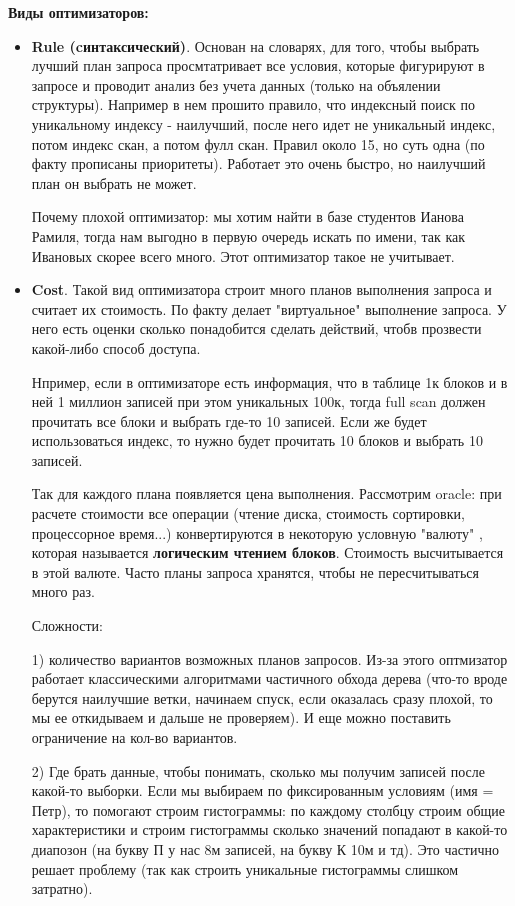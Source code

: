 \textbf{Виды оптимизаторов:} 
\begin{itemize}
    \item \textbf{Rule (cинтаксический)}. Основан на словарях, для того, чтобы выбрать лучший план запроса просмтатривает все условия, которые фигурируют в запросе и проводит анализ без учета данных (только на объялении структуры). Например в нем прошито правило, что индексный поиск по уникальному индексу - наилучший, после него идет не уникальный индекс, потом индекс скан, а потом фулл скан. Правил около 15, но суть одна (по факту прописаны приоритеты). Работает это очень быстро, но наилучший план он выбрать не может.
    
Почему плохой оптимизатор: мы хотим найти в базе студентов Ианова Рамиля, тогда нам выгодно в первую очередь искать по имени, так как Ивановых скорее всего много. Этот оптимизатор такое не учитывает. 

\item \textbf{Cost}. Такой вид оптимизатора строит много планов выполнения запроса и считает их стоимость. По факту делает "виртуальное" выполнение запроса. У него есть оценки сколько понадобится сделать действий, чтобв прозвести какой-либо способ доступа. 
    
Нпример, если в оптимизаторе есть информация, что в таблице 1к блоков и в ней 1 миллион записей при этом уникальных 100к, тогда full scan должен прочитать все блоки и выбрать где-то 10 записей. Если же будет использоваться индекс, то нужно будет прочитать 10 блоков и выбрать 10 записей. 
    
Так для каждого плана появляется цена выполнения. Рассмотрим oracle: при расчете стоимости все операции (чтение диска, стоимость сортировки, процессорное время...) конвертируются в некоторую условную "валюту" , которая называется \textbf{логическим чтением блоков}. Стоимость высчитывается в этой валюте. Часто планы запроса хранятся, чтобы не пересчитываться много раз. 
    
Сложности: 
    
1) количество вариантов возможных планов запросов. Из-за этого оптмизатор работает классическими алгоритмами частичного обхода дерева (что-то вроде берутся наилучшие ветки, начинаем спуск, если оказалась сразу плохой, то мы ее откидываем и дальше не проверяем). И еще можно поставить ограничение на кол-во вариантов. 
    
2) Где брать данные, чтобы понимать, сколько мы получим записей после какой-то выборки. Если мы выбираем по фиксированным условиям (имя = Петр), то помогают строим гистограммы: по каждому столбцу строим общие характеристики и строим гистограммы сколько значений попадают в какой-то диапозон (на букву П у нас 8м записей, на букву К 10м и тд). Это частично решает проблему (так как строить уникальные гистограммы слишком затратно). 
    

\end{itemize}
